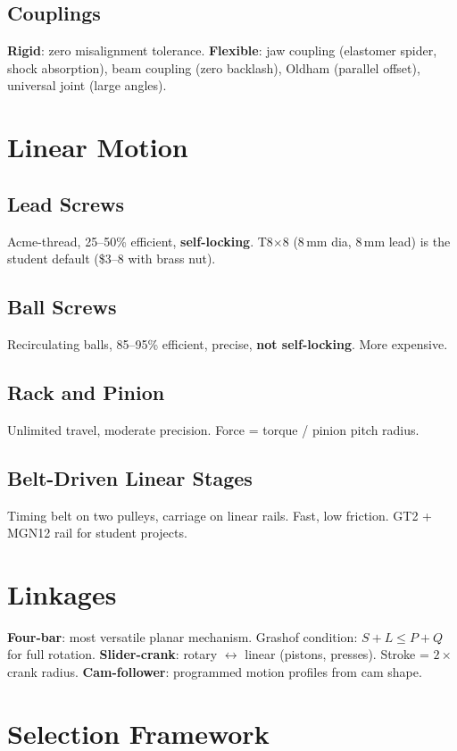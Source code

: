 \subsection{Couplings}
\textbf{Rigid}: zero misalignment tolerance. \textbf{Flexible}: jaw coupling (elastomer spider, shock absorption), beam coupling (zero backlash), Oldham (parallel offset), universal joint (large angles).

\section{Linear Motion}
\subsection{Lead Screws}
Acme-thread, 25--50\% efficient, \textbf{self-locking}. T8$\times$8 (8\,mm dia, 8\,mm lead) is the student default (\$3--8 with brass nut).

\subsection{Ball Screws}
Recirculating balls, 85--95\% efficient, precise, \textbf{not self-locking}. More expensive.

\subsection{Rack and Pinion}
Unlimited travel, moderate precision. Force = torque / pinion pitch radius.

\subsection{Belt-Driven Linear Stages}
Timing belt on two pulleys, carriage on linear rails. Fast, low friction. GT2 + MGN12 rail for student projects.

\section{Linkages}
\textbf{Four-bar}: most versatile planar mechanism. Grashof condition: $S + L \leq P + Q$ for full rotation. \textbf{Slider-crank}: rotary $\leftrightarrow$ linear (pistons, presses). Stroke = $2\times$ crank radius. \textbf{Cam-follower}: programmed motion profiles from cam shape.

\section{Selection Framework}


